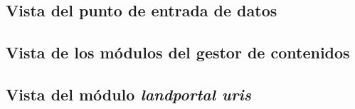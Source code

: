 \subsection{Vista del punto de entrada de datos}
\label{vista_receiver}



\subsection{Vista de los módulos del gestor de contenidos}
\label{vista_modulos_cms}


\subsection{Vista del módulo \textit{landportal uris}}
\label{vista_landportal_uris}